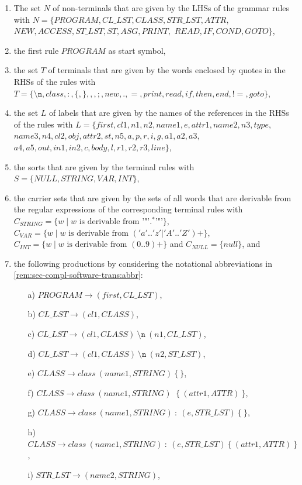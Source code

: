 \begin{example}
\begin{enumerate}
  \item The set $N$ of non-terminals that are given by the LHSs of the grammar rules with $N=\{PROGRAM,CL\_LST,CLASS,STR\_LST,ATTR,$ $NEW,ACCESS,ST\_LST,ST,ASG,PRINT,$ $READ,IF,COND,GOTO\}$,
  \item the first rule $PROGRAM$ as start symbol,
  \item the set $T$ of terminals that are given by the words enclosed by quotes in the RHSs of the rules with $T=\{\texttt{\textbackslash n},class,:,\{,\},,,;,new,.,=,print,read,if,then,end,!=,goto\}$,
  \item the set $L$ of labels that are given by the names of the references in the RHSs of the rules with $L=\{first,cl1,n1,n2,name1,e,attr1,name2,n3,type,$ $name3,n4,cl2,obj,attr2,st,n5,a,p,r,i,g,a1,a2,a3,$ $a4,a5,out,in1,in2,c,body,l,r1,r2,r3,line\}$,
  \item the sorts that are given by the terminal rules with $S=\{NULL,STRING,VAR,INT\}$,
  \item the carrier sets that are given by the sets of all words that are derivable from the regular expressions of the corresponding terminal rules with $C_{STRING}=\{w \mid w \text{ is derivable from '"'} .^* \text{'"'}\}$, $C_{VAR}=\{w \mid w \text{ is derivable from } ('a'..'z'|'A'..'Z')+\}$, $C_{INT}=\{w \mid w \text{ is derivable from } (0..9)+\}$ and $C_{NULL}=\{null\}$, and
  \item the following productions by considering the notational abbreviations in \cref{rem:sec-compl-software-trans:abbr}:
  \begin{enumerate}
    \item[a)] $PROGRAM \to (first,CL\_LST)$,
    \item[b)] $CL\_LST \to (cl1,CLASS)$,
    \item[c)] $CL\_LST \to (cl1,CLASS)\ \texttt{\textbackslash n}\ (n1,CL\_LST)$,
    \item[d)] $CL\_LST \to (cl1,CLASS)\ \texttt{\textbackslash n}\ (n2,ST\_LST)$,
    \item[e)] $CLASS \to class\ (name1,STRING)\ \{\ \}$,
    \item[f)] $CLASS \to class\ (name1,STRING)\ $ $\{\ (attr1,ATTR)\ \}$,
    \item[g)] $CLASS \to class\ (name1,STRING)\ :\ (e,STR\_LST)\ \{\ \}$,
    \item[h)] $CLASS \to class\ (name1,STRING)\ :\ (e,STR\_LST)\ \{\ (attr1,ATTR)\ \}$,
    \item[i)] $STR\_LST \to (name2,STRING)$,

\end{enumerate}
\end{enumerate}
\end{example}

